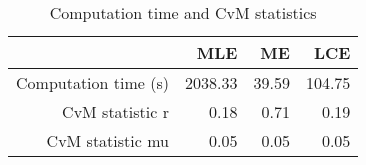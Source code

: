 \begin{table}[ht]
\centering
\begin{tabular}{rrrr}
  \hline
 & MLE & ME & LCE \\ 
  \hline
Computation time (s) & 2038.33 & 39.59 & 104.75 \\ 
  CvM statistic r & 0.18 & 0.71 & 0.19 \\ 
  CvM statistic mu & 0.05 & 0.05 & 0.05 \\ 
   \hline
\end{tabular}
\caption{Computation time and CvM statistics} 
\label{tab:nbinom:time:cvm}
\end{table}
